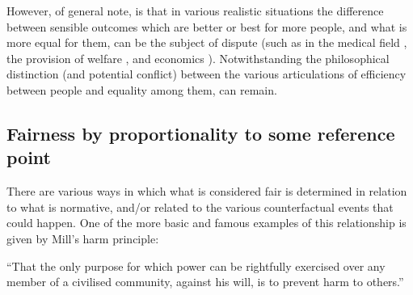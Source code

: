 However, of general note, is that in various realistic situations the difference between sensible outcomes which are better or best for more people, and what is more equal for them, can be the subject of dispute (such as in the medical field \citep{Reidpath2012,RePEc:chy:respap:120cherp}, the provision of welfare \citep{10.2307/27522452}, and economics \citep{10.1093/oep/gpz040}). Notwithstanding the philosophical distinction (and potential conflict) between the various articulations of efficiency between people and equality among them, can remain.



\subsection{Fairness by proportionality to some reference point}\label{sec:reference_points}

There are various ways in which what is considered fair is determined in relation to what is normative, and/or related to the various counterfactual events that could happen.
One of the more basic and famous examples of this relationship is given by Mill's harm principle:

\begin{displayquote}
``That the only purpose for which power can be rightfully exercised over any member of a civilised community, against his will, is to prevent harm to others.'' \cite[Chapter 1]{Mill2Gutenberg}
\end{displayquote}

